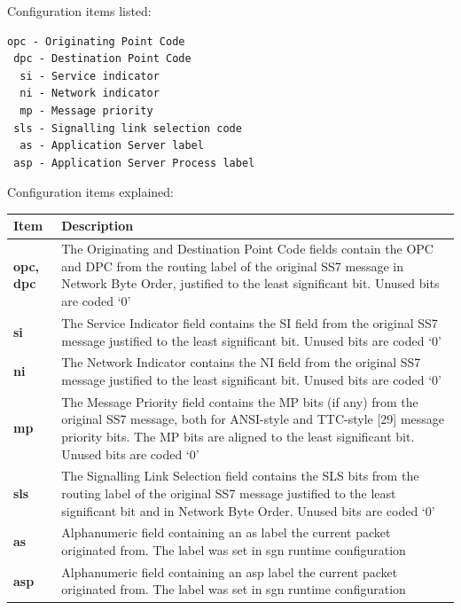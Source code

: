 \documentclass[a4paper,latin]{paper}
\begin{document}
\noindent{}Configuration items listed:
\begin{lstlisting}[style=BashInputStyle, belowskip=\baselineskip]
 opc - Originating Point Code
 dpc - Destination Point Code
  si - Service indicator     
  ni - Network indicator
  mp - Message priority 
 sls - Signalling link selection code
  as - Application Server label      
 asp - Application Server Process label
\end{lstlisting}
\noindent{}Configuration items explained:\\
\begin{tabularx}{\textwidth}{ | l | X |}
	\hline
	Item	 				& Description \\
	\hline
	\textbf{opc, dpc}			& The Originating and Destination Point Code fields contain the OPC
						  and DPC from the routing label of the original SS7 message in Network
						  Byte Order, justified to the least significant bit.  Unused bits are
						  coded `0' \\
	\textbf{si}				& The Service Indicator field contains the SI field from the original
						  SS7 message justified to the least significant bit.  Unused bits are
						  coded `0' \\
	\textbf{ni}				& The Network Indicator contains the NI field from the original SS7
   						  message justified to the least significant bit.  Unused bits are
   						  coded `0' \\ 
	\textbf{mp}				& The Message Priority field contains the MP bits (if any) from the
   						  original SS7 message, both for ANSI-style and TTC-style [29] message
   						  priority bits. The MP bits are aligned to the least significant bit.
   						  Unused bits are coded `0'\\ 
	\textbf{sls}				& The Signalling Link Selection field contains the SLS bits from the
   						  routing label of the original SS7 message justified to the least
   						  significant bit and in Network Byte Order.  Unused bits are coded
   						  `0'\\ 
	\textbf{as}				& Alphanumeric field containing an \acrfull{as} label the current packet originated from. 
						  The label was set in \acrfull{sgn} runtime configuration \\ 
	\textbf{asp}				& Alphanumeric field containing an \acrfull{asp} label the current packet originated from.
						  The label was set in \acrfull{sgn} runtime configuration \\
	\hline
\end{tabularx}
\end{document}
